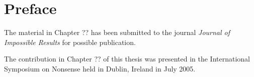 
\chapter*{Preface}
The material in Chapter ?? has been submitted to the journal
\textit{Journal of Impossible Results} for possible publication.

The contribution in Chapter ?? of this thesis was presented in the
International Symposium on Nonsense held in Dublin, Ireland in July
2005.

